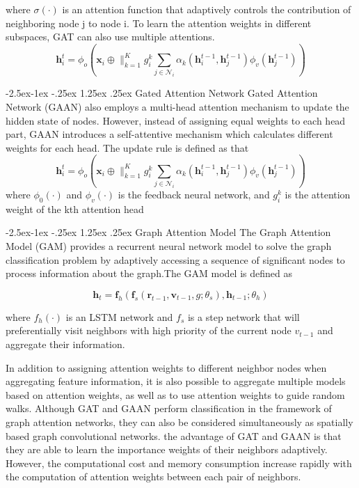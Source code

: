 \documentclass[11pt,en]{elegantpaper}
\makeatletter
\renewcommand\paragraph{\@startsection{paragraph}{4}{\z@}%
            {-2.5ex\@plus -1ex \@minus -.25ex}%
            {1.25ex \@plus .25ex}%
            {\normalfont\normalsize\bfseries}}
\makeatother
\begin{document}
where $\sigma(\cdot)$ is an attention function that adaptively controls the contribution of neighboring node j to node i. To learn the attention weights in different subspaces, GAT can also use multiple attentions.
$$\mathbf{h}_{i}^{t}=\phi_{o}\left(\mathbf{x}_{i} \oplus \|_{k=1}^{K} g_{i}^{k} \sum_{j \in \mathcal{N}_{i}} \alpha_{k}\left(\mathbf{h}_{i}^{t-1}, \mathbf{h}_{j}^{t-1}\right) \phi_{v}\left(\mathbf{h}_{j}^{t-1}\right)\right)$$

\paragraph{Gated Attention Network}
Gated Attention Network (GAAN) also employs a multi-head attention mechanism to update the hidden state of nodes. However, instead of assigning equal weights to each head part, GAAN introduces a self-attentive mechanism which calculates different weights for each head. The update rule is defined as that
$$\mathbf{h}_{i}^{t}=\phi_{o}\left(\mathbf{x}_{i} \oplus \|_{k=1}^{K} g_{i}^{k} \sum_{j \in \mathcal{N}_{i}} \alpha_{k}\left(\mathbf{h}_{i}^{t-1}, \mathbf{h}_{j}^{t-1}\right) \phi_{v}\left(\mathbf{h}_{j}^{t-1}\right)\right)$$
where $\phi_0(\cdot)$ and $\phi_v(\cdot)$ is the feedback neural network, and $g_i^k$ is the attention weight of the kth attention head

\paragraph{Graph Attention Model}
The Graph Attention Model (GAM) provides a recurrent neural network model to solve the graph classification problem by adaptively accessing a sequence of significant nodes to process information about the graph.The GAM model is defined as

$$\mathbf{h}_{t}=\mathbf{f}_{h}\left(\mathbf{f}_{s}\left(\mathbf{r}_{t-1}, \mathbf{v}_{t-1}, g ; \theta_{s}\right), \mathbf{h}_{t-1} ; \theta_{h}\right)$$

where $f_h(\cdot)$ is an LSTM network and $f_s$ is a step network that will preferentially visit neighbors with high priority of the current node $v_{t-1}$ and aggregate their information.

In addition to assigning attention weights to different neighbor nodes when aggregating feature information, it is also possible to aggregate multiple models based on attention weights, as well as to use attention weights to guide random walks. Although GAT and GAAN perform classification in the framework of graph attention networks, they can also be considered simultaneously as spatially based graph convolutional networks. the advantage of GAT and GAAN is that they are able to learn the importance weights of their neighbors adaptively. However, the computational cost and memory consumption increase rapidly with the computation of attention weights between each pair of neighbors.
\end{document}
